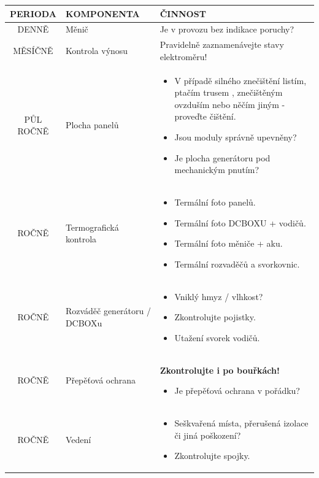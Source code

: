 \documentclass{book}
\begin{document}
	\begin{table}
	\begin{tabular}{|c|p{}|p{}|}
	\hline 
	\textbf{PERIODA} & \textbf{KOMPONENTA} & \textbf{ČINNOST} \\ 
	\hline 
	DENNĚ & Měnič & Je v provozu bez indikace poruchy? \\ 
	\hline 
	MĚSÍČNĚ & Kontrola výnosu & Pravidelně zaznamenávejte stavy elektroměru! \\ 
	\hline 
	PŮL ROČNĚ & Plocha panelů & 
	\begin{itemize}
	\item V případě silného znečištění listím, ptačím trusem , znečištěným ovzduším nebo něčím jiným - proveďte čištění.
	\item Jsou moduly správně upevněny?
	\item Je plocha generátoru pod mechanickým pnutím?
	\end{itemize} \\ 
	\hline 
	ROČNĚ & Termografická kontrola & 
	\begin{itemize}
	\item Termální foto panelů.
	\item Termální foto DCBOXU + vodičů.
	\item Termální foto měniče + aku.
	\item Termální rozvaděčů a svorkovnic.
	\end{itemize} \\ 
	\hline 
	ROČNĚ & Rozváděč generátoru / DCBOXu & 
	\begin{itemize}
	\item Vniklý hmyz / vlhkost?
	\item Zkontrolujte pojistky.
	\item Utažení svorek vodičů.
	\end{itemize} \\ 
	\hline 
	ROČNĚ & Přepěťová ochrana  & 
	\textbf{Zkontrolujte i po bouřkách!}
	\begin{itemize}
	\item Je přepěťová ochrana v pořádku?
	\end{itemize} \\ 
	\hline 
	ROČNĚ & Vedení  & 
	\begin{itemize}
	\item Seškvařená místa, přerušená izolace či jiná poškození?
	\item Zkontrolujte spojky.
	\end{itemize} \\ 

\end{tabular}
\end{table}
\end{document}
